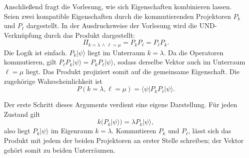 \begin{classroomqa}\end{classroomqa}

\begin{classroomqa}\end{classroomqa}

Anschließend fragt die Vorlesung, wie sich Eigenschaften kombinieren lassen. Seien zwei kompatible Eigenschaften durch die kommutierenden Projektoren \(P_k\) und \(P_\ell\) dargestellt. In der Ausdrucksweise der Vorlesung wird die UND-Verknüpfung durch das Produkt dargestellt:
\begin{equation}
\Pi_{k=\lambda\,\wedge\,\ell=\mu}=P_kP_\ell=P_\ell P_k.
\end{equation}
Die Logik ist einfach. \(P_k|\psi\rangle\) liegt im Unterraum \(k=\lambda\). Da die Operatoren kommutieren, gilt \(P_\ell P_k|\psi\rangle=P_kP_\ell|\psi\rangle\), sodass derselbe Vektor auch im Unterraum \(\ell=\mu\) liegt. Das Produkt projiziert somit auf die gemeinsame Eigenschaft. Die zugehörige Wahrscheinlichkeit ist
\begin{equation}
P(k=\lambda,\ell=\mu)=\langle\psi|P_kP_\ell|\psi\rangle.
\end{equation}

Der erste Schritt dieses Arguments verdient eine eigene Darstellung. Für jeden Zustand gilt
\begin{equation}
k\bigl(P_k|\psi\rangle\bigr)=\lambda P_k|\psi\rangle,
\end{equation}
also liegt \(P_k|\psi\rangle\) im Eigenraum \(k=\lambda\). Kommutieren \(P_k\) und \(P_\ell\), lässt sich das Produkt mit jedem der beiden Projektoren an erster Stelle schreiben; der Vektor gehört somit zu beiden Unterräumen.

